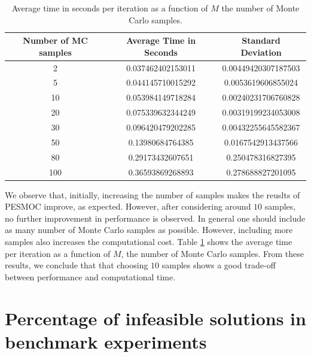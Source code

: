 \documentclass[review,preprint,12pt]{elsarticle}
\begin{document}
\begin{table}[h!]
\centering
\caption{Average time in seconds per iteration as a function of $M$ the number of Monte Carlo samples.}
{\small
\begin{tabular}{c | c | c}
 \hline
 {\bf Number of MC samples} & {\bf Average Time in Seconds} & {\bf Standard Deviation} \\
 \hline
2 & 0.037462402153011 & 0.00449420307187503 \\
5 & 0.044145710015292 & 0.0053619606855024 \\
10 & 0.053984149718284 & 0.00240231706760828 \\
20 & 0.075339632344249 & 0.00319199234053008 \\
30 & 0.096420479202285 & 0.00432255645582367 \\
50 & 0.13980684764385 & 0.0167542913437566 \\
80 & 0.29173432607651 & 0.250478316827395 \\
100 &0.36593869268893 & 0.278688827201095 \\
 \hline
\end{tabular}
}
\label{table:times_monte_carlo_samples}
\end{table}

We observe that, initially, increasing the number of samples makes the reuslts of PESMOC improve, as expected.
However, after considering around $10$ samples,  no further improvement in performance is observed.
In general one should include as many number of Monte Carlo samples as possible. However, including more samples 
also increases the computational cost. Table \ref{table:times_monte_carlo_samples} shows the average time per iteration
as a function of $M$, the number of Monte Carlo samples. From these results, we conclude that  that choosing $10$ samples 
shows a good trade-off between performance and computational time.



\section{Percentage of infeasible solutions in benchmark experiments}
\end{document}

